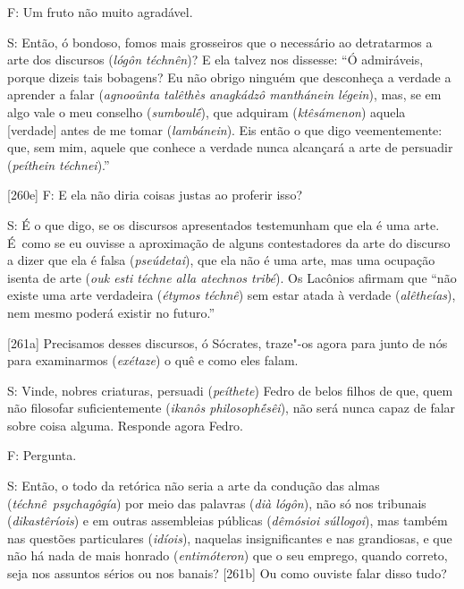 F: Um fruto não muito agradável.

 

S: Então, ó bondoso, fomos mais grosseiros que o necessário ao
detratarmos a arte dos discursos (\emph{lógôn téchnên})? E ela talvez
nos dissesse: ``Ó admiráveis, porque dizeis tais bobagens? Eu não obrigo
ninguém que desconheça a verdade a aprender a falar (\emph{agnooûnta
talêthès anagkádzô manthánein légein}), mas, se em algo vale o meu
conselho (\emph{sumboulḗ}), que adquiram (\emph{ktêsámenon}) aquela
[verdade] antes de me tomar (\emph{lambánein}). Eis então o que digo
veementemente: que, sem mim, aquele que conhece a verdade nunca
alcançará a arte de persuadir (\emph{peíthein téchnei}).''

 

[260e] F: E ela não diria coisas justas ao proferir isso?

 

S: É o que digo, se os discursos apresentados testemunham que ela é uma
arte. É~como se eu ouvisse a aproximação de alguns contestadores da arte
do discurso a dizer que ela é falsa (\emph{pseúdetai}), que ela não é
uma arte, mas uma ocupação isenta de arte (\emph{ouk esti téchne alla
atechnos tribé}). Os Lacônios afirmam que ``não existe uma arte
verdadeira (\emph{étymos téchnê}) sem estar atada à verdade
(\emph{alêtheías}), nem mesmo poderá existir no futuro.''

 

 

[261a] Precisamos desses discursos, ó Sócrates, traze"-os agora para
junto de nós para examinarmos (\emph{exétaze}) o quê e como eles falam.

 

S: Vinde, nobres criaturas, persuadi (\emph{peíthete}) Fedro de belos
filhos de que, quem não filosofar suficientemente (\emph{ikanôs
philosophḗsêi}), não será nunca capaz de falar sobre coisa alguma.
Responde agora Fedro.

 

F: Pergunta.

 

S: Então, o todo da retórica não seria a arte da condução das almas
(\emph{téchnê}~\emph{psychagôgía}) por meio das palavras (\emph{dià
lógôn}), não só nos tribunais (\emph{dikastêríois}) e em outras
assembleias públicas (\emph{dêmósioi súllogoi}), mas também nas questões
particulares (\emph{idíois}), naquelas insignificantes e nas grandiosas,
e que não há nada de mais honrado (\emph{entimóteron}) que o seu
emprego, quando correto, seja nos assuntos sérios ou nos banais?
[261b] Ou como ouviste falar disso tudo?

